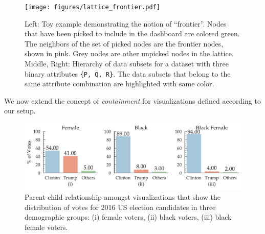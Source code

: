 \begin{figure}[ht!]
\texttt{[image: figures/lattice\_frontier.pdf]}
\caption{Left: Toy example demonstrating the notion of ``frontier''. Nodes that have been picked to include in the dashboard are colored green. The neighbors of the set of picked nodes are the frontier nodes, shown in pink. Grey nodes are other unpicked nodes in the lattice. Middle, Right: Hierarchy of data subsets for a dataset with three binary attributes {\tt \{P, Q, R\}}. The data subsets that belong to the same attribute combination are highlighted with same color.}
\label{fig:lattice}
\end{figure}
We now extend the concept of \emph{containment} for visualizations defined according to our setup. 


\begin{figure}[bht]
\centering
\includegraphics[scale=0.4]{figures/US_Election_Parent_Child.pdf}
\caption{Parent-child relationship amongst visualizations that show the distribution of votes for 2016 US election candidates in three demographic groups: (i) female voters, (ii) black voters, (iii) black female voters.}
\label{fig:parent_child}
\end{figure}


